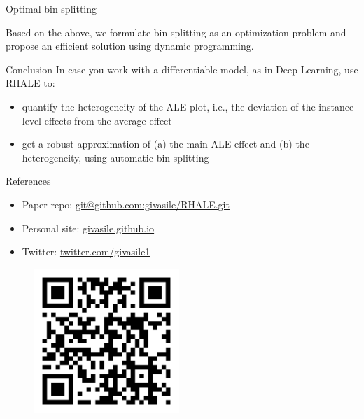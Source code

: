 \documentclass[final]{beamer}
\newlength{\colwidth}
\begin{document}
\begin{frame}[t]
\begin{columns}[t]
\begin{column}{\colwidth}
\begin{defbox}{Optimal bin-splitting}{}
        \vspace{10mm}

        Based on the above, we formulate bin-splitting as an optimization problem and propose an efficient solution using dynamic programming.

  \end{defbox}

  
      \begin{alertblock}{Conclusion} In case you work with a differentiable model, as in Deep Learning, use RHALE to:
        \begin{itemize}
        \item quantify the heterogeneity of the ALE plot, i.e., the deviation of the instance-level effects from the average effect
        \item get a robust approximation of (a) the main ALE effect and (b) the heterogeneity, using automatic bin-splitting
      \end{itemize}
    \end{alertblock}

    \begin{block}{References}
      \begin{itemize}
      \item \large Paper repo: \href{git@github.com:givasile/RHALE.git}{git@github.com:givasile/RHALE.git}
      \item \large Personal site: \href{givasile.github.io}{givasile.github.io}
      \item \large Twitter: \href{https://twitter.com/givasile1}{twitter.com/givasile1}
      \end{itemize}
    \end{block}

    \begin{figure}
      \centering
      \includegraphics[width=0.49\textwidth]{./Publications.png}
    \end{figure}


\end{column}
\end{columns}
\end{frame}
\end{document}
